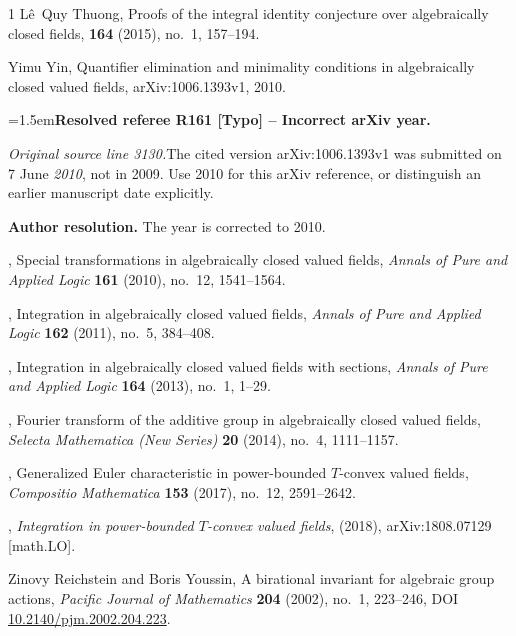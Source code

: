 \documentclass[12pt]{amsart}
\newcommand{\ResolvedRefereeRemark}[5]{%
  \par\medskip\begingroup\normalfont\small\color{gray}%
  \emergencystretch=1.5em\noindent\textbf{Resolved referee R#1 [#2] -- #3.}\par\nobreak\noindent #4\par
  \medskip\color{ResolutionGreen}\noindent\textbf{Author resolution.} #5\par
  \endgroup\medskip
}
\theoremstyle{plain}
\theoremstyle{definition}
\theoremstyle{remark}
\numberwithin{equation}{section}
\theoremstyle{plain}
\newcommand{\0}{\emptyset}
\begin{document}
\begin{thebibliography}{1}
L{\^e}~Quy Thuong,
\newblock Proofs of the integral identity conjecture over algebraically closed
  fields,
 \textbf{164} (2015), no.~1, 157--194.

Yimu Yin, {Quantifier elimination and minimality conditions in
  algebraically closed valued fields}, arXiv:1006.1393v1, 2010.

\ResolvedRefereeRemark{161}{Typo}{Incorrect arXiv year}{%
\textit{Original source line 3130.}\quad The cited version arXiv:1006.1393v1 was submitted on 7 June \emph{2010}, not in 2009. Use 2010 for this arXiv reference, or distinguish an earlier manuscript date explicitly.
}{The year is corrected to 2010.}

\bysame, {Special transformations in algebraically closed valued fields},
  {\em Annals of Pure and Applied Logic} \textbf{161} (2010), no.~12, 1541--1564.

\bysame, {Integration in algebraically closed valued fields}, {\em Annals of
  Pure and Applied Logic} \textbf{162} (2011), no.~5, 384--408.

\bysame, {Integration in algebraically closed valued fields with
  sections}, {\em Annals of Pure and Applied Logic} \textbf{164} (2013), no.~1,
  1--29.

\bysame, {{F}ourier transform of the additive group in algebraically
  closed valued fields}, {\em Selecta Mathematica (New Series)} \textbf{20} (2014), no.~4,
  1111--1157.

\bysame, {Generalized {E}uler characteristic in power-bounded {$T$}-convex
  valued fields}, {\em Compositio Mathematica} \textbf{153} (2017), no.~12,
  2591--2642.

\bysame, \emph{Integration in power-bounded {$T$}-convex valued fields},
  (2018), arXiv:1808.07129 [math.LO].


Zinovy Reichstein and Boris Youssin,
{A birational invariant for algebraic group actions},
{\em Pacific Journal of Mathematics} \textbf{204} (2002), no.~1,
223--246, DOI \href{https://doi.org/10.2140/pjm.2002.204.223}{10.2140/pjm.2002.204.223}.

\end{thebibliography}
\end{document}

